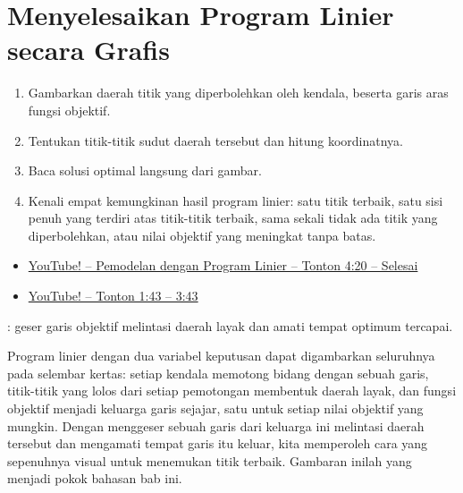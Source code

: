 \chapter[Menyelesaikan Program Linier secara Grafis]{Menyelesaikan Program Linier secara Grafis\texorpdfstring{\protect\footnotemark}{}}

\begin{outcome}
\begin{enumerate}
\item[A.] Gambarkan daerah titik yang diperbolehkan oleh kendala, beserta garis aras fungsi objektif.
\item[B.] Tentukan titik-titik sudut daerah tersebut dan hitung koordinatnya.
\item[C.] Baca solusi optimal langsung dari gambar.
\item[D.] Kenali empat kemungkinan hasil program linier: satu titik terbaik, satu sisi penuh yang terdiri atas titik-titik terbaik, sama sekali tidak ada titik yang diperbolehkan, atau nilai objektif yang meningkat tanpa batas.
\end{enumerate}
\end{outcome}
\begin{resource}
\begin{itemize}
\item \href{https://www.youtube.com/watch?v=K7TL5NMlKIk&ab_channel=Dr.TreforBazett}{YouTube! -- Pemodelan dengan Program Linier -- Tonton 4:20 -- Selesai}
\item \href{https://www.youtube.com/watch?v=E72DWgKP_1Y&t=1014s&ab_channel=TomS}{YouTube! -- Tonton 1:43 -- 3:43}
\end{itemize}
\end{resource}

\begin{tryit}
: geser garis objektif melintasi daerah layak dan amati tempat optimum tercapai.
\end{tryit}


Program linier dengan dua variabel keputusan dapat digambarkan seluruhnya pada selembar kertas: setiap kendala memotong bidang dengan sebuah garis, titik-titik yang lolos dari setiap pemotongan membentuk daerah layak, dan fungsi objektif menjadi keluarga garis sejajar, satu untuk setiap nilai objektif yang mungkin. Dengan menggeser sebuah garis dari keluarga ini melintasi daerah tersebut dan mengamati tempat garis itu keluar, kita memperoleh cara yang sepenuhnya visual untuk menemukan titik terbaik. Gambaran inilah yang menjadi pokok bahasan bab ini.

